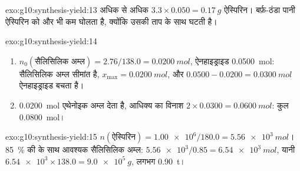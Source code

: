 \begin{solution}{exo:g10:synthesis-yield:13}
अधिक से अधिक $3.3 \times 0.050 = \qty{0.17}{g}$ ऐस्पिरिन। बर्फ़-ठंडा पानी
ऐस्पिरिन को और भी कम घोलता है, क्योंकि उसकी  ताप के साथ
घटती है।
\end{solution}

\begin{solution}{exo:g10:synthesis-yield:14}
\begin{enumerate}
  \item $n_0(\text{सैलिसिलिक अम्ल}) = 2.76 / 138.0 = \qty{0.0200}{mol}$,
        ऐनहाइड्राइड \qty{0.0500}{mol}: सैलिसिलिक अम्ल सीमांत है,
        $x_{\max} = \qty{0.0200}{mol}$, और $0.0500 - 0.0200 =
        \qty{0.0300}{mol}$ ऐनहाइड्राइड बचता है।
  \item {} \qty{0.0200}{mol} एथेनोइक अम्ल देता है, आधिक्य का
        विनाश $2 \times 0.0300 = \qty{0.0600}{mol}$:
        कुल \qty{0.0800}{mol}।
\end{enumerate}
\end{solution}

\begin{solution}{exo:g10:synthesis-yield:15}
$n(\text{ऐस्पिरिन}) = \num{1.00e6} / 180.0 = \qty{5.56e3}{mol}$।
\qty{85}{\percent} की  के साथ आवश्यक सैलिसिलिक अम्ल:
$\num{5.56e3} / 0.85 = \qty{6.54e3}{mol}$, यानी
$\num{6.54e3} \times 138.0 = \qty{9.0e5}{g}$, लगभग \qty{0.90}{t}।
\end{solution}

